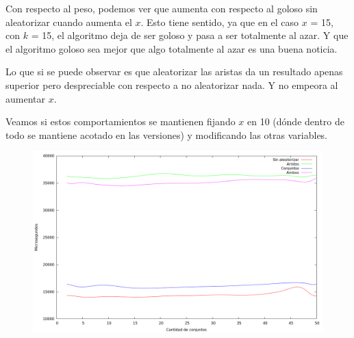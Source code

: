 \vspace*{0.5cm}

Con respecto al peso, podemos ver que aumenta con respecto al goloso sin
aleatorizar cuando aumenta el $x$. Esto tiene sentido, ya que en el caso
$x$ = 15, con $k$ = 15, el algoritmo deja de ser goloso y pasa a ser totalmente
al azar.
Y que el algoritmo goloso sea mejor que algo totalmente al azar es una buena
noticia.

Lo que si se puede observar es que aleatorizar las aristas da un resultado
apenas superior pero despreciable con respecto a no aleatorizar nada. Y no
empeora al aumentar $x$.

Veamos si estos comportamientos se mantienen fijando $x$ en 10 (dónde dentro
de todo se mantiene acotado en las versiones) y modificando las otras variables.

\vspace*{0.5cm}

\begin{figure}[h]
  \begin{center}
    \includegraphics[scale=0.35]{imagenes/grasp-goloso-k-tiempo.png}
  \end{center}
\end{figure}

\vspace*{0.5cm}

\vspace*{0.5cm}

